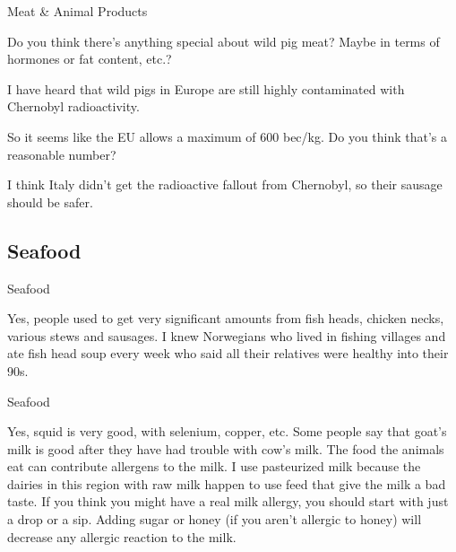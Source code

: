 \documentclass[11pt,oneside,openany,extrafontsizes]{memoir}
\begin{document}
\begin{emailexchange}{Meat \& Animal Products}

    \begin{question}
        Do you think there's anything special about wild pig meat? Maybe in terms of hormones or fat content, etc.?
    \end{question}

    \begin{answer}
      I have heard that wild pigs in Europe are still highly contaminated with Chernobyl radioactivity.
    \end{answer}

    \begin{question}
        So it seems like the EU allows a maximum of 600 bec/kg. Do you think that's a reasonable number?
    \end{question}

    \begin{answer}
      I think Italy didn't get the radioactive fallout from Chernobyl, so their sausage should be safer.
    \end{answer}
\end{emailexchange}

\subsection{Seafood}

\begin{standalonequote}{Seafood}

    \begin{answer}
        Yes, people used to get very significant amounts from fish heads, chicken necks, various stews and sausages. I knew Norwegians who lived in fishing villages and ate fish head soup every week who said all their relatives were healthy into their 90s.
    \end{answer}
\end{standalonequote}

\begin{standalonequote}{Seafood}

    \begin{answer}
        Yes, squid is very good, with selenium, copper, etc. Some people say that goat's milk is good after they have had trouble with cow's milk. The food the animals eat can contribute allergens to the milk. I use pasteurized milk because the dairies in this region with raw milk happen to use feed that give the milk a bad taste. If you think you might have a real milk allergy, you should start with just a drop or a sip. Adding sugar or honey (if you aren't allergic to honey) will decrease any allergic reaction to the milk.
    \end{answer}
\end{standalonequote}
\end{document}
